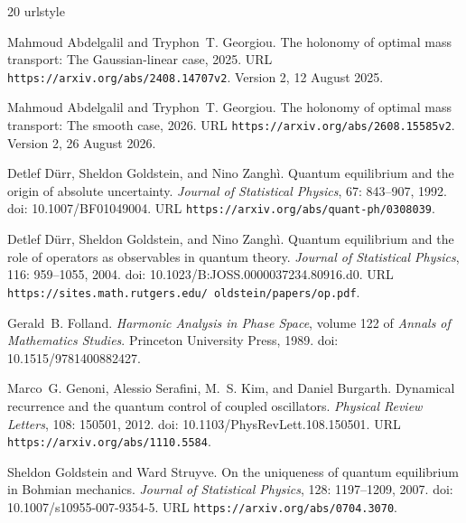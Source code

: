 \documentclass[11pt]{article}
\numberwithin{equation}{section}
\theoremstyle{definition}
\begin{document}
\begin{thebibliography}{20}
\providecommand{\natexlab}[1]{#1}
\providecommand{\url}[1]{\texttt{#1}}
\expandafter\ifx\csname urlstyle\endcsname\relax
  \providecommand{\doi}[1]{doi: #1}\else
  \providecommand{\doi}{doi: \begingroup \urlstyle{rm}\Url}\fi

Mahmoud Abdelgalil and Tryphon~T. Georgiou.
\newblock The holonomy of optimal mass transport: The {Gaussian}-linear case,
  2025.
\newblock URL \url{https://arxiv.org/abs/2408.14707v2}.
\newblock Version 2, 12 August 2025.

Mahmoud Abdelgalil and Tryphon~T. Georgiou.
\newblock The holonomy of optimal mass transport: The smooth case, 2026.
\newblock URL \url{https://arxiv.org/abs/2608.15585v2}.
\newblock Version 2, 26 August 2026.

Detlef D{\"u}rr, Sheldon Goldstein, and Nino Zangh{\`i}.
\newblock Quantum equilibrium and the origin of absolute uncertainty.
\newblock \emph{Journal of Statistical Physics}, 67: 843--907, 1992.
\newblock \doi{10.1007/BF01049004}.
\newblock URL \url{https://arxiv.org/abs/quant-ph/0308039}.

Detlef D{\"u}rr, Sheldon Goldstein, and Nino Zangh{\`i}.
\newblock Quantum equilibrium and the role of operators as observables in
  quantum theory.
\newblock \emph{Journal of Statistical Physics}, 116: 959--1055, 2004.
\newblock \doi{10.1023/B:JOSS.0000037234.80916.d0}.
\newblock URL \url{https://sites.math.rutgers.edu/~oldstein/papers/op.pdf}.

Gerald~B. Folland.
\newblock \emph{Harmonic Analysis in Phase Space}, volume 122 of \emph{Annals
  of Mathematics Studies}.
\newblock Princeton University Press, 1989.
\newblock \doi{10.1515/9781400882427}.

Marco~G. Genoni, Alessio Serafini, M.~S. Kim, and Daniel Burgarth.
\newblock Dynamical recurrence and the quantum control of coupled oscillators.
\newblock \emph{Physical Review Letters}, 108: 150501, 2012.
\newblock \doi{10.1103/PhysRevLett.108.150501}.
\newblock URL \url{https://arxiv.org/abs/1110.5584}.

Sheldon Goldstein and Ward Struyve.
\newblock On the uniqueness of quantum equilibrium in {Bohmian} mechanics.
\newblock \emph{Journal of Statistical Physics}, 128: 1197--1209,
  2007.
\newblock \doi{10.1007/s10955-007-9354-5}.
\newblock URL \url{https://arxiv.org/abs/0704.3070}.


\end{thebibliography}
\end{document}
